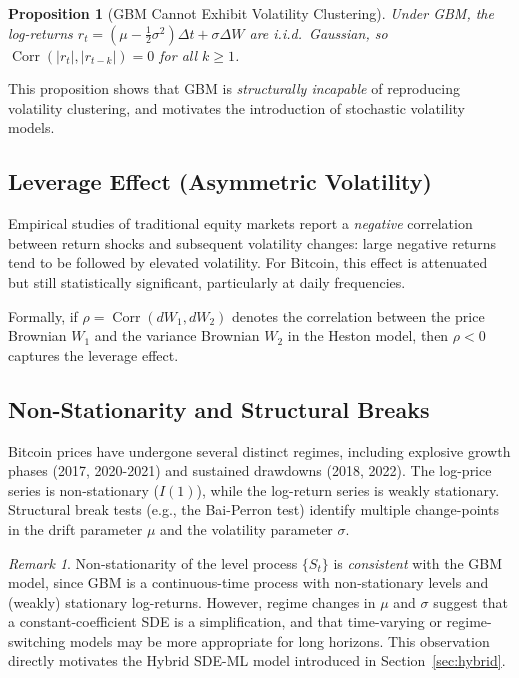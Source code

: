 \documentclass[12pt, a4paper, oneside]{report}
\theoremstyle{plain}
\newtheorem{proposition}[theorem]{Proposition}
\theoremstyle{definition}
\theoremstyle{remark}
\newtheorem{remark}[theorem]{Remark}
\begin{document}
\begin{proposition}[GBM Cannot Exhibit Volatility Clustering]
Under GBM, the log-returns $r_t = (\mu - \frac{1}{2}\sigma^2)\Delta t + \sigma\Delta W$
are i.i.d.\ Gaussian, so $\operatorname{Corr}(|r_t|, |r_{t-k}|) = 0$ for all
$k \geq 1$.
\end{proposition}

This proposition shows that GBM is \emph{structurally incapable} of reproducing
volatility clustering, and motivates the introduction of stochastic volatility models.

\subsection{Leverage Effect (Asymmetric Volatility)}

Empirical studies of traditional equity markets report a \emph{negative} correlation
between return shocks and subsequent volatility changes: large negative returns tend
to be followed by elevated volatility.  For Bitcoin, this effect is attenuated but
still statistically significant, particularly at daily frequencies.

Formally, if $\rho = \operatorname{Corr}(dW_1, dW_2)$ denotes the correlation between
the price Brownian $W_1$ and the variance Brownian $W_2$ in the Heston model, then
$\rho < 0$ captures the leverage effect.

\subsection{Non-Stationarity and Structural Breaks}

Bitcoin prices have undergone several distinct regimes, including explosive growth
phases (2017, 2020-2021) and sustained drawdowns (2018, 2022).  The log-price
series is non-stationary ($I(1)$), while the log-return series is weakly stationary.
Structural break tests (e.g., the Bai-Perron test) identify multiple change-points
in the drift parameter $\mu$ and the volatility parameter $\sigma$.

\begin{remark}
Non-stationarity of the level process $\{S_t\}$ is \emph{consistent} with the GBM
model, since GBM is a continuous-time process with non-stationary levels and (weakly)
stationary log-returns.  However, regime changes in $\mu$ and $\sigma$ suggest that
a constant-coefficient SDE is a simplification, and that time-varying or
regime-switching models may be more appropriate for long horizons.  This observation
directly motivates the Hybrid SDE-ML model introduced in Section~\ref{sec:hybrid}.
\end{remark}
\end{document}
